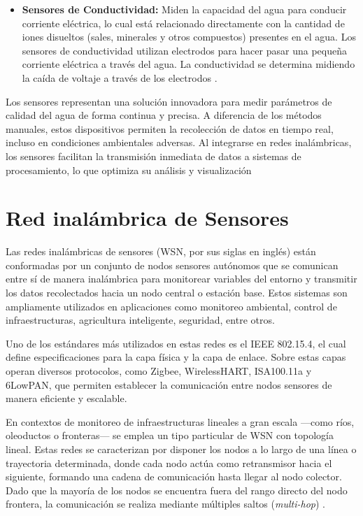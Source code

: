 \begin{itemize}
        \item \textbf{Sensores de Conductividad:} Miden la capacidad del agua para conducir corriente eléctrica, lo cual está relacionado directamente con la cantidad de iones disueltos (sales, minerales y otros compuestos) presentes en el agua. 
        Los sensores de conductividad utilizan electrodos para hacer pasar una pequeña corriente eléctrica a través del agua. La conductividad se determina midiendo la caída de voltaje a través de los electrodos \cite{waterQualitySensors}.
        
    \end{itemize}

Los sensores representan una solución innovadora para medir parámetros de calidad del agua de forma continua y precisa. A diferencia de los métodos manuales, estos dispositivos permiten la recolección de datos en tiempo real, incluso en condiciones ambientales adversas. Al integrarse en redes inalámbricas, los sensores facilitan la transmisión inmediata de datos a sistemas de procesamiento, lo que optimiza su análisis y visualización
    
\section{Red inalámbrica de Sensores}

Las redes inalámbricas de sensores (WSN, por sus siglas en inglés) están conformadas por un conjunto de nodos sensores autónomos que se comunican entre sí de manera inalámbrica para monitorear variables del entorno y transmitir los datos recolectados hacia un nodo central o estación base. Estos sistemas son ampliamente utilizados en aplicaciones como monitoreo ambiental, control de infraestructuras, agricultura inteligente, seguridad, entre otros.

Uno de los estándares más utilizados en estas redes es el IEEE 802.15.4, el cual define especificaciones para la capa física y la capa de enlace. Sobre estas capas operan diversos protocolos, como Zigbee, WirelessHART, ISA100.11a y 6LowPAN, que permiten establecer la comunicación entre nodos sensores de manera eficiente y escalable.

En contextos de monitoreo de infraestructuras lineales a gran escala —como ríos, oleoductos o fronteras— se emplea un tipo particular de WSN con topología lineal. Estas redes se caracterizan por disponer los nodos a lo largo de una línea o trayectoria determinada, donde cada nodo actúa como retransmisor hacia el siguiente, formando una cadena de comunicación hasta llegar al nodo colector. Dado que la mayoría de los nodos se encuentra fuera del rango directo del nodo frontera, la comunicación se realiza mediante múltiples saltos (\textit{multi-hop}) \cite{egas2021red}.

